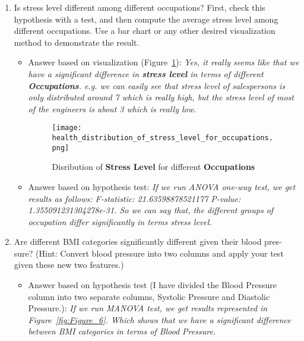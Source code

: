 \documentclass{article}
\begin{document}
\begin{enumerate}
\begin{enumerate}[label=(\alph*)]
        \item Is stress level different among different occupations? First, check this
        hypothesis with a test, and then compute the average stress level among
        different occupations. Use a bar chart or any other desired visualization
        method to demonstrate the result.
        \begin{itemize}
            \item Answer based on visualization (Figure~\ref{fig:Figure_5}):
            \textit{Yes, it really seems like that we have a significant difference in \textbf{stress level} in terms of different \textbf{Occupations}. e.g. we can easily see that stress level of salespersons is only distributed around 7 which is really high, but the stress level of most of the engineers is about 3 which is really low.}
            \begin{figure}[H]  %

                \centering
                \texttt{[image: health\_distribution\_of\_stress\_level\_for\_occupations.png]}  %
                \caption{Disribution of \textbf{Stress Level} for different \textbf{Occupations}}
                \label{fig:Figure_5}  %
    
            \end{figure}
            
            \item Answer based on hypothesis test:
            \textit{If we run ANOVA one-way test, we get results as follows: F-statistic: 21.63598878521177 P-value: 1.355091231304278e-31. So we can say that, the different groups of occupation differ significantly in terms stress level.}
        \end{itemize}

        \item Are different BMI categories significantly different given their blood pres-
        sure? (Hint: Convert blood pressure into two columns and apply your
        test given these new two features.)
        \begin{itemize}
            \item Answer based on hypothesis test (I have divided the Blood Pressure \\ 
            column into two separate columns, Systolic Pressure and Diastolic Pressure.):
            \textit{If we run MANOVA test, we get results represented in Figure~\ref{fig:Figure_6}. Which shows that we have a significant difference between BMI categories in terms of Blood Pressure.}
            

\end{itemize}
\end{enumerate}
\end{enumerate}
\end{document}
